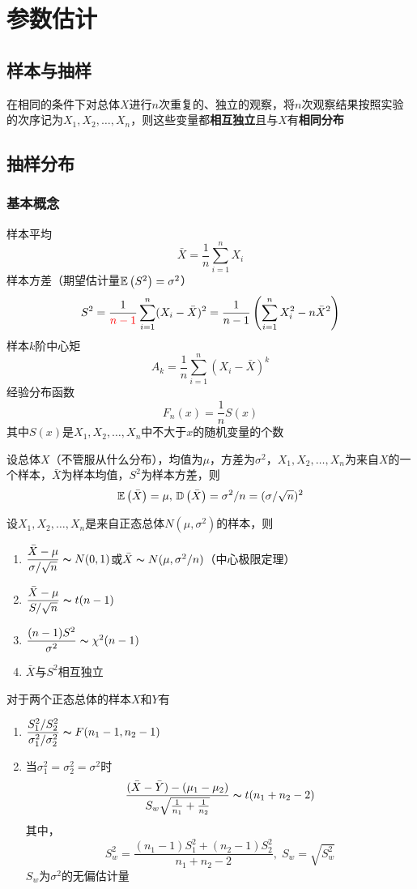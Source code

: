 
\section{参数估计}
\subsection{样本与抽样}
\begin{definition}[简单随机样本]
在相同的条件下对总体$X$进行$n$次重复的、独立的观察，将$n$次观察结果按照实验的次序记为$X_1,X_2,\ldots,X_n$，则这些变量都\textbf{相互独立}且与$X$有\textbf{相同分布}
\end{definition}

\subsection{抽样分布}
\subsubsection{基本概念}
\begin{definition}[统计量]
样本平均
\[\bar{X}=\frac{1}{n}\sum_{i=1}^nX_i\]
样本方差（期望估计量$\mathbb{E}\left(S^2\right)=\sigma^2$）
\[S^2=\frac{1}{\textcolor{red}{n-1}}\sum_{i=1}^n(X_i-\bar{X})^2=\frac{1}{n-1}\left(\sum_{i=1}^nX_i^2-n\bar{X}^2\right)\]
样本$k$阶中心矩
\[A_k=\frac{1}{n}\sum_{i=1}^n(X_i-\bar{X})^k\]
经验分布函数
\[F_n(x)=\frac{1}{n}S(x)\]
其中$S(x)$是$X_1,X_2,\ldots,X_n$中不大于$x$的随机变量的个数
\end{definition}
\begin{theorem}
设总体$X$（不管服从什么分布），均值为$\mu$，方差为$\sigma^2$，$X_1,X_2,\ldots,X_n$为来自$X$的一个样本，$\bar{X}$为样本均值，$S^2$为样本方差，则
\[\mathbb{E}\left(\bar{X}\right)=\mu,\,\mathbb{D}\left(\bar{X}\right)=\sigma^2/n=(\sigma/\sqrt{n})^2\]
\end{theorem}
\begin{theorem}
设$X_1,X_2,\ldots,X_n$是来自正态总体$N(\mu,\sigma^2)$的样本，则
\begin{enumerate}
	\item $\dfrac{\bar{X}-\mu}{\sigma/\sqrt{n}}\thicksim N(0,1)$或$\bar{X}\thicksim N(\mu,\sigma^2/n)$（中心极限定理）
	\item $\dfrac{\bar{X}-\mu}{S/\sqrt{n}}\thicksim t(n-1)$
	\item $\dfrac{(n-1)S^2}{\sigma^2}\thicksim \chi^2(n-1)$
	\item $\bar{X}$与$S^2$相互独立
\end{enumerate}
\end{theorem}
\begin{theorem}
对于两个正态总体的样本$X$和$Y$有
\begin{enumerate}
	\item $\displaystyle \frac{S_1^2/S_2^2}{\sigma_1^2/\sigma_2^2}\thicksim F(n_1-1,n_2-1)$
	\item 当$\sigma_1^2=\sigma_2^2=\sigma^2$时
	\[\frac{(\bar{X}-\bar{Y})-(\mu_1-\mu_2)}{S_w\sqrt{\frac{1}{n_1}+\frac{1}{n_2}}}\thicksim t(n_1+n_2-2)\]
	其中，
	\[S_w^2=\frac{(n_1-1)S_1^2+(n_2-1)S_2^2}{n_1+n_2-2},\;S_w=\sqrt{S_w^2}\]
	$S_w$为$\sigma^2$的无偏估计量
\end{enumerate}
\end{theorem}

